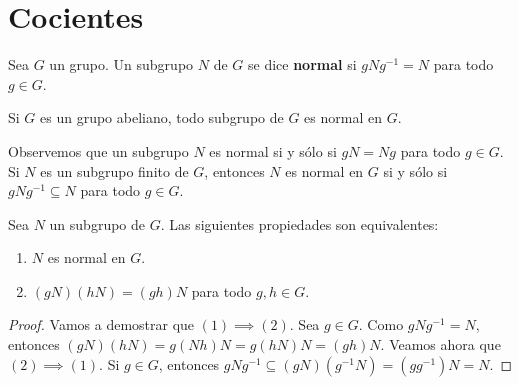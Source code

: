 \chapter{Cocientes}

\begin{definition}
	Sea $G$ un grupo. 
	Un subgrupo $N$ de $G$ se dice \textbf{normal} si $gNg^{-1}=N$ para todo
	$g\in G$.
\end{definition}

\begin{example}
    Si $G$ es un grupo abeliano, todo subgrupo de $G$ es normal en $G$. 
\end{example}

Observemos que un subgrupo $N$ es normal si y sólo si $gN=Ng$ para todo $g\in
G$.  Si $N$ es un subgrupo finito de $G$, entonces $N$ es normal en $G$ si y
sólo si $gNg^{-1}\subseteq N$ para todo $g\in G$. 

\begin{proposition}
	Sea $N$ un subgrupo de $G$. Las siguientes propiedades son equivalentes:
	\begin{enumerate}
		\item $N$ es normal en $G$.
		\item $(gN)(hN)=(gh)N$ para todo $g,h\in G$.
	\end{enumerate}
\end{proposition}

\begin{proof}
	Vamos a demostrar que $(1)\implies(2)$. Sea $g\in G$. Como $gNg^{-1}=N$,
	entonces $(gN)(hN)=g(Nh)N=g(hN)N=(gh)N$. Veamos ahora que $(2)\implies(1)$. Si $g\in G$, entonces
	$gNg^{-1}\subseteq (gN)(g^{-1}N)=(gg^{-1})N=N$. 
\end{proof}

